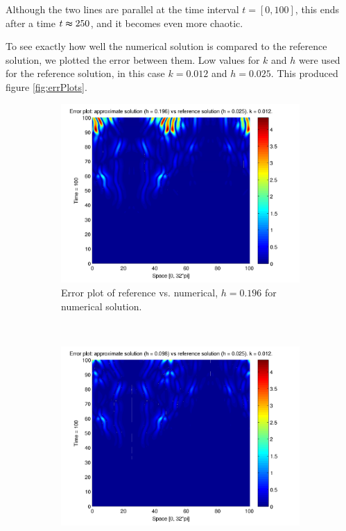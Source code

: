 Although the two lines are parallel at the time interval $t = [0,100]$, this ends after a time $t \thickapprox 250$, and it becomes even more chaotic.

To see exactly how well the numerical solution is compared to the reference solution, we plotted the error between them. Low values for $k$ and $h$ were used for the reference solution, in this case $k = 0.012$ and $h = 0.025$. This produced figure \ref{fig:errPlots}.

\begin{figure}[H]
        \centering
        \begin{subfigure}[b]{0.52\textwidth}
                \includegraphics[width=\textwidth]{../PDFs/IMEX/errPlots_worst_scaled.pdf}
                \caption{Error plot of reference vs. numerical, $h = 0.196$ for numerical solution.}
                \label{fig:highError}
        \end{subfigure}%
        ~ %
        \begin{subfigure}[b]{0.52\textwidth}
                \includegraphics[width=\textwidth]{../PDFs/IMEX/errPlots_best_scaled.pdf}

\end{subfigure}
\end{figure}
